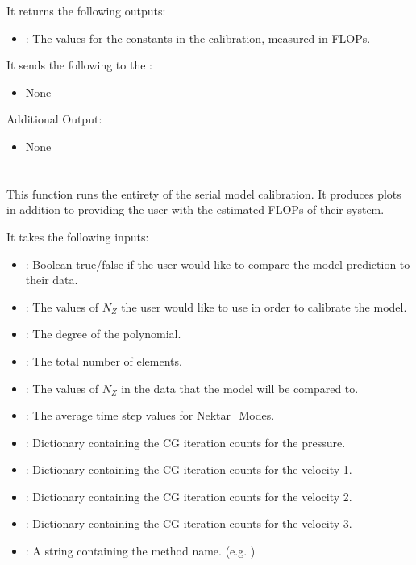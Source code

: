 It returns the following outputs:

\begin{itemize}
\item {}: The values for the constants in the calibration, measured in FLOPs.
\end{itemize}

It sends the following to the :

\begin{itemize}
\item None
\end{itemize}

Additional Output:
\begin{itemize}
\item None
\end{itemize}

\section{}
This function runs the entirety of the serial model calibration. It produces plots in addition to providing the user with the estimated FLOPs of their system.

It takes the following inputs:

\begin{itemize}
\item {}: Boolean true/false if the user would like to compare the model prediction to their data.
\item {}: The values of \(N_Z\) the user would like to use in order to calibrate the model. 
\item {}: The degree of the polynomial.
\item {}: The total number of elements.
\item {}: The values of \(N_Z\) in the data that the model will be compared to.
\item {}: The average time step values for Nektar\_Modes.
\item {}: Dictionary containing the CG iteration counts for the pressure.
\item {}: Dictionary containing the CG iteration counts for the velocity 1.
\item {}: Dictionary containing the CG iteration counts for the velocity 2.
\item {}: Dictionary containing the CG iteration counts for the velocity 3.
\item {}: A string containing the method name. (e.g. )

\end{itemize}


